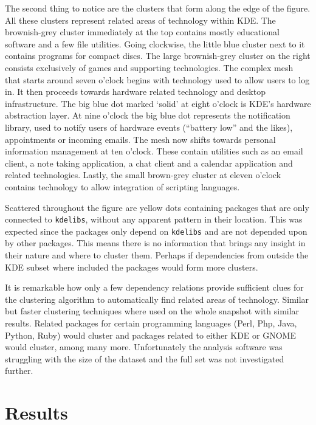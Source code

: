 \documentclass[smallextended,final]{svjour3}
\begin{document}
The second thing to notice are the clusters that form along the edge of the figure. All these clusters represent related areas of technology within KDE. The brownish-grey cluster immediately at the top contains mostly educational software and a few file utilities. Going clockwise, the little blue cluster next to it contains programs for compact discs. The large brownish-grey cluster on the right consists exclusively of games and supporting technologies. The complex mesh that starts around seven o'clock begins with technology used to allow users to log in. It then proceeds towards hardware related technology and desktop infrastructure. The big blue dot marked `solid' at eight o'clock is KDE's hardware abstraction layer. At nine o'clock the big blue dot represents the notification library, used to notify users of hardware events (``battery low'' and the likes), appointments or incoming emails. The mesh now shifts towards personal information management at ten o'clock. These contain utilities such as an email client, a note taking application, a chat client and a calendar application and related technologies. Lastly, the small brown-grey cluster at eleven o'clock contains technology to allow integration of scripting languages.

Scattered throughout the figure are yellow dots containing packages that are only connected to \verb|kdelibs|, without any apparent pattern in their location. This was expected since the packages only depend on \verb|kdelibs| and are not depended upon by other packages. This means there is no information that brings any insight in their nature and where to cluster them. Perhaps if dependencies from outside the KDE subset where included the packages would form more clusters.

It is remarkable how only a few dependency relations provide sufficient clues for the clustering algorithm to automatically find related areas of technology. Similar but faster clustering techniques where used on the whole snapshot with similar results. Related packages for certain programming languages (Perl, Php, Java, Python, Ruby) would cluster and packages related to either KDE or GNOME would cluster, among many more. Unfortunately the analysis software was struggling with the size of the dataset and the full set was not investigated further.

\section{Results}
\end{document}
